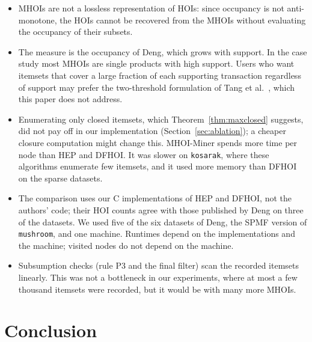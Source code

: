 \documentclass[pdflatex,sn-mathphys,Numbered]{sn-jnl}
\theoremstyle{thmstyleone}
\theoremstyle{thmstyletwo}
\theoremstyle{thmstylethree}
\newcommand{\Algo}{MHOI-Miner}
\begin{document}
\begin{itemize}
\item MHOIs are not a lossless representation of HOIs: since occupancy is not anti-monotone, the HOIs cannot be recovered from the MHOIs without evaluating the occupancy of their subsets.
\item The measure is the occupancy of Deng, which grows with support. In the case study most MHOIs are single products with high support. Users who want itemsets that cover a large fraction of each supporting transaction regardless of support may prefer the two-threshold formulation of Tang et al.\ \cite{tang2012occupancy}, which this paper does not address.
\item Enumerating only closed itemsets, which Theorem~\ref{thm:maxclosed} suggests, did not pay off in our implementation (Section~\ref{sec:ablation}); a cheaper closure computation might change this. \Algo{} spends more time per node than HEP and DFHOI. It was slower on \texttt{kosarak}, where these algorithms enumerate few itemsets, and it used more memory than DFHOI on the sparse datasets.
\item The comparison uses our C implementations of HEP and DFHOI, not the authors' code; their HOI counts agree with those published by Deng on three of the datasets. We used five of the six datasets of Deng, the SPMF version of \texttt{mushroom}, and one machine. Runtimes depend on the implementations and the machine; visited nodes do not depend on the machine.
\item Subsumption checks (rule P3 and the final filter) scan the recorded itemsets linearly. This was not a bottleneck in our experiments, where at most a few thousand itemsets were recorded, but it would be with many more MHOIs.
\end{itemize}

\section{Conclusion}\label{sec:concl}
\end{document}
